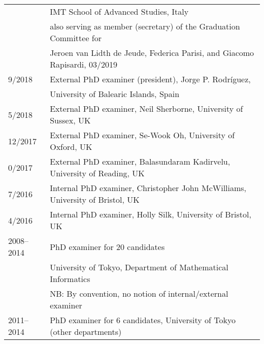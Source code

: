 \documentclass[11pt,letter]{article}
\renewenvironment{itemize}{
  \begin{list}{}{
    \setlength{\leftmargin}{1.5em}
    \setlength{\itemsep}{0.25em}
    \setlength{\parskip}{0pt}
    \setlength{\parsep}{0.25em}
  }
}{
  \end{list}
}
\begin{document}
\begin{itemize}
\begin{tabular}{ll}
& IMT School of Advanced Studies, Italy\\
%
& also serving as member (secretary)
%
%
of the Graduation Committee for\\
& Jeroen van Lidth de Jeude, Federica Parisi, and Giacomo Rapisardi, 03/2019\\
%
9/2018 & External PhD examiner (president), Jorge P. Rodr\'{i}guez,\\
& University of Balearic Islands, Spain\\
%
5/2018 & External PhD examiner, Neil Sherborne, University of Sussex, UK\\
%
12/2017 & External PhD examiner, Se-Wook Oh, University of Oxford, UK\\
%
0/2017 & External PhD examiner, 
Balasundaram Kadirvelu, University of Reading, UK\\
%
%
7/2016 & Internal PhD examiner, Christopher John McWilliams, University of Bristol, UK\\
%
4/2016 & Internal PhD examiner, Holly Silk, University of Bristol, UK\\
%
2008--2014 & PhD examiner for 20 candidates\\
& University of Tokyo, Department of Mathematical Informatics\\
& NB: By convention, no notion of internal/external examiner\\
2011--2014 & PhD examiner for 6 candidates, University of Tokyo (other departments)




\end{tabular}
\end{itemize}
\end{document}
